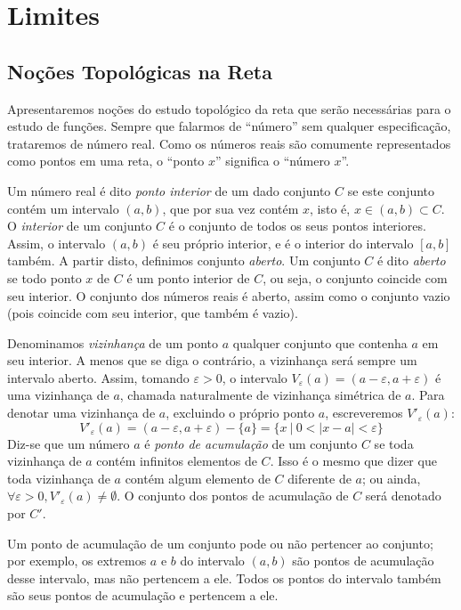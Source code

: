 \chapter{Limites}

\section{Noções Topológicas na Reta}

Apresentaremos noções do estudo topológico da reta que serão necessárias para o estudo de funções. Sempre que falarmos de ``número'' sem qualquer especificação, trataremos de número real. Como os números reais são comumente representados como pontos em uma reta, o ``ponto $x$'' significa o ``número $x$''.\par 
Um número real é dito \emph{ponto interior} de um dado conjunto $C$ se este conjunto contém um intervalo $(a,b)$, que por sua vez contém $x$, isto é, $x \in (a,b) \subset C$. O \emph{interior} de um conjunto $C$ é o conjunto de todos os seus pontos interiores. Assim, o intervalo $(a,b)$ é seu próprio interior, e é o interior do intervalo $[a,b]$ também. A partir disto, definimos conjunto \emph{aberto}. Um conjunto $C$ é dito \emph{aberto} se todo ponto $x$ de $C$ é um ponto interior de $C$, ou seja, o conjunto coincide com seu interior. O conjunto dos números reais é aberto, assim como o conjunto vazio (pois coincide com seu interior, que também é vazio). \par 
Denominamos \emph{vizinhança} de um ponto $a$ qualquer conjunto que contenha $a$ em seu interior. A menos que se diga o contrário, a vizinhança será sempre um intervalo aberto. Assim, tomando $\varepsilon > 0$, o intervalo $V_\varepsilon(a)=(a-\varepsilon,a+\varepsilon)$ é uma vizinhança de $a$, chamada naturalmente de vizinhança simétrica de $a$. Para denotar uma vizinhança de $a$, excluindo o próprio ponto $a$, escreveremos $V'_\varepsilon(a)$: \[V'_\varepsilon(a)=(a-\varepsilon,a+\varepsilon)-\{a\}=\{x \: | \: 0< |x-a| < \varepsilon \}\]
Diz-se que um número $a$ é \emph{ponto de acumulação} de um conjunto $C$ se toda vizinhança de $a$ contém infinitos elementos de $C$. Isso é o mesmo que dizer que toda vizinhança de $a$ contém algum elemento de $C$ diferente de $a$; ou ainda, $\forall \varepsilon>0, V'_\varepsilon(a)\neq \emptyset$. O conjunto dos pontos de acumulação de $C$ será denotado por $C'$. \par 
Um ponto de acumulação de um conjunto pode ou não pertencer ao conjunto; por exemplo, os extremos $a$ e $b$ do intervalo $(a,b)$ são pontos de acumulação desse intervalo, mas não pertencem a ele. Todos os pontos do intervalo também são seus pontos de acumulação e pertencem a ele. \par 
